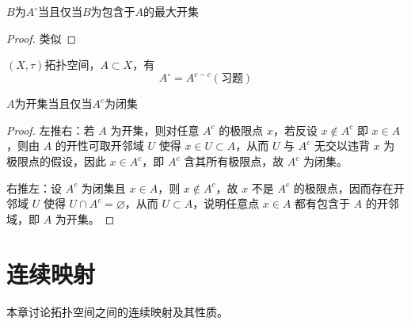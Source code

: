 \documentclass[lang=cn,a4paper,newtx,figureplace=section,tableplace=section]{elegantbook}
\begin{document}
\begin{remark}
    $B$为$A^\circ$当且仅当$B$为包含于$A$的最大开集
\end{remark}
\begin{proof}
    类似
\end{proof}

\begin{proposition}
    $(X,\tau)$拓扑空间，$A\subset X$，有
    \begin{equation}
        A^\circ=A^{c-c}(\text{习题})
    \end{equation}
\end{proposition}
\begin{proposition}
    $A$为开集当且仅当$A^c$为闭集
\end{proposition}
\begin{proof}
    左推右：若 $A$ 为开集，则对任意 $A^c$ 的极限点 $x$，若反设 $x\notin A^c$ 即 $x\in A$，则由 $A$ 的开性可取开邻域 $U$ 使得 $x\in U\subset A$，从而 $U$ 与 $A^c$ 无交以违背 $x$ 为极限点的假设，因此 $x\in A^c$，即 $A^c$ 含其所有极限点，故 $A^c$ 为闭集。

    右推左：设 $A^c$ 为闭集且 $x\in A$，则 $x\notin A^c$，故 $x$ 不是 $A^c$ 的极限点，因而存在开邻域 $U$ 使得 $U\cap A^c=\varnothing$，从而 $U\subset A$，说明任意点 $x\in A$ 都有包含于 $A$ 的开邻域，即 $A$ 为开集。
\end{proof}

\chapter{连续映射}

本章讨论拓扑空间之间的连续映射及其性质。
\end{document}
